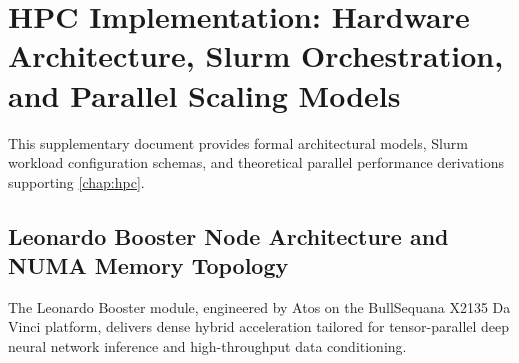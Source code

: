 
\section*{HPC Implementation: Hardware Architecture, Slurm
Orchestration, and Parallel Scaling Models}
\label{sec:supp_hpc_implementation}

This supplementary document provides formal architectural models,
Slurm workload
configuration schemas, and theoretical parallel performance
derivations supporting
\cref{chap:hpc}.


\subsection*{Leonardo Booster Node Architecture and NUMA Memory Topology}
\label{subsec:supp_numa_topology}

The Leonardo Booster module, engineered by Atos on the BullSequana
X2135 Da Vinci platform,
delivers dense hybrid acceleration tailored for tensor-parallel deep
neural network
inference and high-throughput data conditioning.

